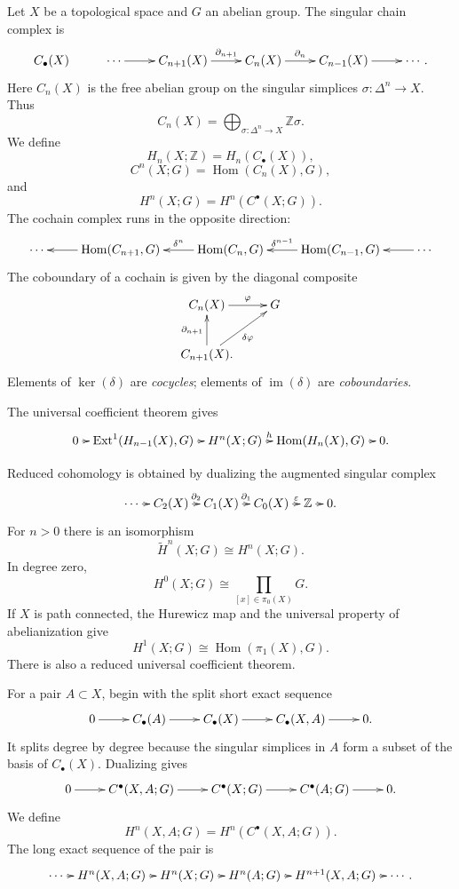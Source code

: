 \noindent
Let $X$ be a topological space and $G$ an
abelian group.  The singular chain complex
is
$$
\xymatrix{
C_\bullet(X)
  & \cdots \ar[r]
  & C_{n+1}(X)
    \ar[r]^-{\partial_{n+1}}
  & C_n(X) \ar[r]^-{\partial_n}
  & C_{n-1}(X) \ar[r]
  & \cdots.
}
$$
Here $C_n(X)$ is the free abelian group on
the singular simplices
$\sigma:\Delta^n\to X$.  Thus
$$
C_n(X)
=
\bigoplus_{\sigma:\Delta^n\to X}
\mathbb{Z}\sigma.
$$
We define
$$
H_n(X;\mathbb{Z})=H_n(C_\bullet(X)),
$$
$$
C^n(X;G)
=
\operatorname{Hom}(C_n(X),G),
$$
and
$$
H^n(X;G)=H^n(C^\bullet(X;G)).
$$
The cochain complex runs in the opposite
direction:
$$
\xymatrix{
\cdots
  & \operatorname{Hom}(C_{n+1},G)
    \ar[l]
  & \operatorname{Hom}(C_n,G)
    \ar[l]_-{\delta^n}
  & \operatorname{Hom}(C_{n-1},G)
    \ar[l]_-{\delta^{n-1}}
  & \cdots \ar[l].
}
$$
The coboundary of a cochain is given by
the diagonal composite
$$
\xymatrix{
C_n(X) \ar[r]^-\varphi
  & G \\
C_{n+1}(X)
  \ar[u]^{\partial_{n+1}}
  \ar[ur]_{\delta\varphi}.
}
$$
Elements of $\ker(\delta)$ are
{\it cocycles}; elements of
$\operatorname{im}(\delta)$ are
{\it coboundaries}.

\noindent
The universal coefficient theorem gives
$$
\xymatrix@C=.55em{
0 \ar[r]
  & \operatorname{Ext}^1
    (H_{n-1}(X),G) \ar[r]
  & H^n(X;G) \ar[r]^-h
  & \operatorname{Hom}(H_n(X),G)
    \ar[r]
  & 0.
}
$$

\noindent
Reduced cohomology is obtained by dualizing
the augmented singular complex
$$
\xymatrix@C=.6em{
\cdots \ar[r]
  & C_2(X) \ar[r]^-{\partial_2}
  & C_1(X) \ar[r]^-{\partial_1}
  & C_0(X) \ar[r]^-\varepsilon
  & \mathbb{Z} \ar[r]
  & 0.
}
$$
For $n>0$ there is an isomorphism
$$
\widetilde H^n(X;G)\cong H^n(X;G).
$$
In degree zero,
$$
H^0(X;G)
\cong
\prod_{[x]\in\pi_0(X)}G.
$$
If $X$ is path connected, the Hurewicz map
and the universal property of abelianization
give
$$
H^1(X;G)
\cong
\operatorname{Hom}(\pi_1(X),G).
$$
There is also a reduced universal
coefficient theorem.

\noindent
For a pair $A\subset X$, begin with the
split short exact sequence
$$
\xymatrix{
0 \ar[r]
  & C_\bullet(A) \ar[r]
  & C_\bullet(X) \ar[r]
  & C_\bullet(X,A) \ar[r]
  & 0.
}
$$
It splits degree by degree because the
singular simplices in $A$ form a subset of
the basis of $C_\bullet(X)$.  Dualizing
gives
$$
\xymatrix{
0 \ar[r]
  & C^\bullet(X,A;G) \ar[r]
  & C^\bullet(X;G) \ar[r]
  & C^\bullet(A;G) \ar[r]
  & 0.
}
$$
We define
$$
H^n(X,A;G)
=
H^n(C^\bullet(X,A;G)).
$$
The long exact sequence of the pair is
$$
\xymatrix@C=.55em{
\cdots \ar[r]
  & H^n(X,A;G) \ar[r]
  & H^n(X;G) \ar[r]
  & H^n(A;G) \ar[r]
  & H^{n+1}(X,A;G) \ar[r]
  & \cdots.
}
$$

